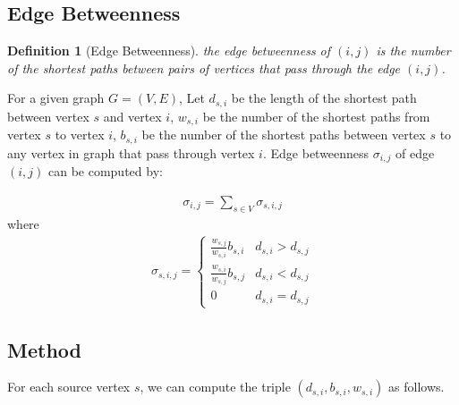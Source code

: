\documentclass[11pt]{article}
\newtheorem{definition}[theorem]{Definition}
\begin{document}
\subsection{Edge Betweenness}

\begin{definition}
  [Edge Betweenness]
  the edge betweenness of $(i,j)$ is the number of the shortest paths between pairs of vertices that pass through the edge $(i,j)$.

\end{definition}

For a given graph $G = (V, E)$, Let $d_{s, i}$ be the length of the shortest path between vertex $s$ and vertex $i$, $w_{s, i}$ be the number of the shortest paths from vertex $s$ to vertex $i$, $b_{s, i}$ be the number of the shortest paths between vertex $s$ to any vertex in graph that pass through vertex $i$. Edge betweenness $\sigma_{i,j}$ of edge $(i,j)$ can be computed by:

\begin{equation}
  \begin{split}
    \sigma_{i,j} = \sum_{s \in V}\sigma_{s,i,j}
  \end{split}
\end{equation} where
\begin{equation}
  \begin{split}
    \sigma_{s,i,j} = \begin{cases}
      \frac{w_{s,j}}{w_{s,i}}b_{s,i} & d_{s,i} > d_{s,j} \\
      \frac{w_{s,i}}{w_{s,j}}b_{s,j} & d_{s,i} < d_{s,j} \\
      0                              & d_{s,i} = d_{s,j}
    \end{cases}
  \end{split}
\end{equation}

\subsection{Method}

For each source vertex $s$, we can compute the triple $(d_{s, i}, b_{s, i}, w_{s, i})$ as follows.\cite{newman2006}
\end{document}
